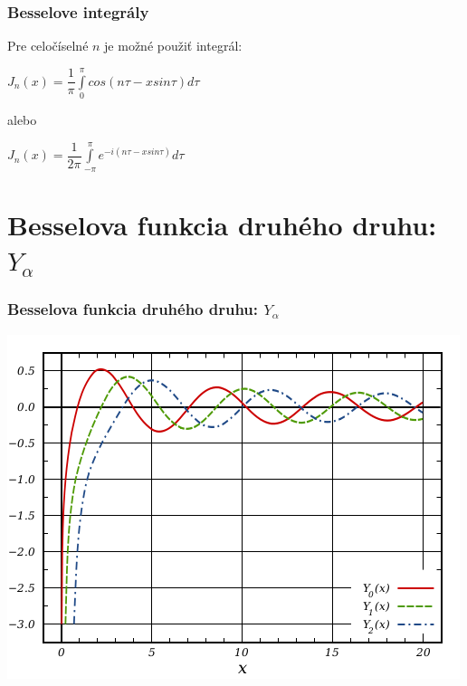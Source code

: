 \documentclass{beamer}
\begin{document}
\begin{frame}
\frametitle{Besselove integrály}

Pre celočíselné $n$ je možné použiť integrál:

\begin{center}
$J_{n}(x) =  \dfrac{1}{\pi}\displaystyle\int\limits_{0}^{\pi} cos(n\tau - x sin \tau) d\tau$
\end{center} alebo
\begin{center}
$J_{n}(x) =  \dfrac{1}{2\pi}\displaystyle\int\limits_{-\pi}^{\pi} e^{-i(n\tau - x sin \tau)}d\tau$
\end{center}
\end{frame}
\section{Besselova funkcia druhého druhu: $Y_{\alpha}$}
\begin{frame}
\frametitle{Besselova funkcia druhého druhu: $Y_{\alpha}$}
\begin{center}
\includegraphics[scale=0.4]{bessel2.png} 
\end{center}
\end{frame}
\end{document}
